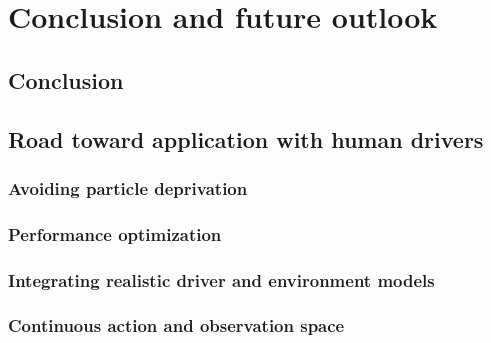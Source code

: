 \chapter{Conclusion and future outlook}
\label{sec:conclusion}

\section{Conclusion}



% 

\section{Road toward application with human drivers}
\subsection{Avoiding particle deprivation}

\subsection{Performance optimization}
\subsection{Integrating realistic driver and environment models}
\subsection{Continuous action and observation space}
